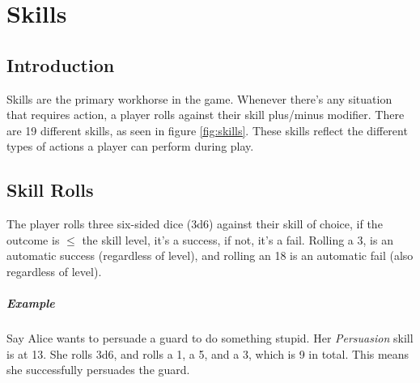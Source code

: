 \chapter{Skills} \label{chap:skills}
\section{Introduction}
Skills are the primary workhorse in the game. 
Whenever there's any situation that requires action, a player rolls against their skill plus/minus modifier. 
There are 19 different skills, as seen in figure \ref{fig:skills}. 
These skills reflect the different types of actions a player can perform during play.


\section{Skill Rolls}
The player rolls three six-sided dice (3d6) against their skill of choice, if the outcome is $\leq$ the skill level, it's a success, if not, it's a fail.
Rolling a 3, is an automatic success (regardless of level), and rolling an 18 is an automatic fail (also regardless of level).

\paragraph{Example} Say Alice wants to persuade a guard to do something stupid. Her \textit{Persuasion} skill is at 13. 
She rolls 3d6, and rolls a 1, a 5, and a 3, which is 9 in total. This means she successfully persuades the guard.

